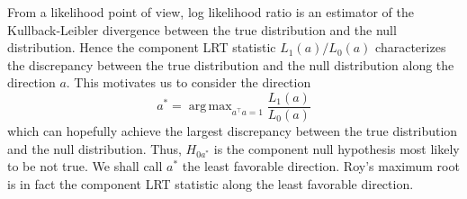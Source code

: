 \documentclass[12pt]{article} %
\DeclareMathOperator*{\argmax}{arg\,max}
\newcommand{\bH}{\mathbf{H}}
\newcommand{\bG}{\mathbf{G}}
\theoremstyle{definition}
\begin{document}
%

From a likelihood point of view, log likelihood ratio is an estimator of the Kullback-Leibler divergence between the true distribution and the null distribution.
Hence the component LRT statistic $L_1(a)/L_0(a)$ characterizes the discrepancy between  the true distribution and the null distribution along the direction $a$.
This motivates us to consider the direction 
\begin{equation}\label{LFDdef1}
    a^*=\argmax_{a^\top a=1}\frac{L_1(a)}{L_0(a)}
\end{equation}
which can hopefully achieve the largest discrepancy between the true distribution and the null distribution.
Thus, $H_{0a^*}$ is the component null hypothesis most likely to be not true.
We shall call $a^*$ the least favorable direction. %
Roy's maximum root is in fact the component LRT statistic along the least favorable direction.




\end{document}
